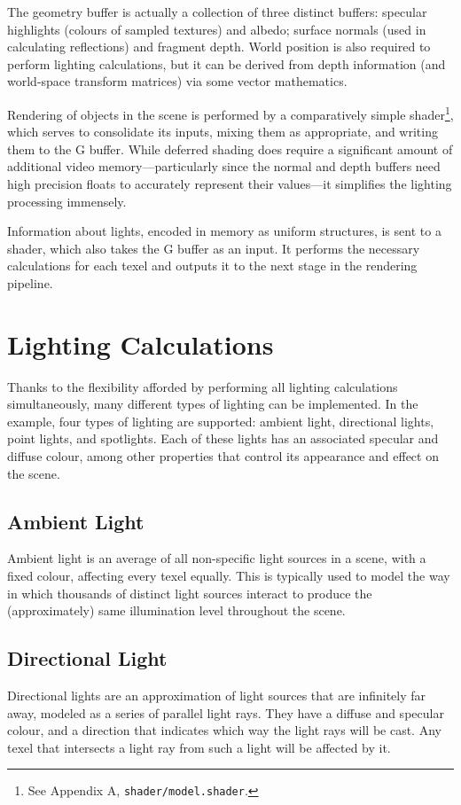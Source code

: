 \documentclass[11pt, oneside]{report}
\begin{document}
The geometry buffer is actually a collection of three distinct buffers: \gls{specular} highlights (colours of sampled textures) and albedo; surface normals (used in calculating reflections) and fragment depth. World position is also required to perform lighting calculations, but it can be derived from depth information (and world-space transform matrices) via some vector mathematics.

Rendering of objects in the scene is performed by a comparatively simple \gls{shader}\footnote{See Appendix A, \texttt{shader/model.shader}.}, which serves to consolidate its inputs, mixing them as appropriate, and writing them to the G buffer. While deferred shading does require a significant amount of additional video memory---particularly since the normal and depth buffers need high precision \glspl{float} to accurately represent their values---it simplifies the lighting processing immensely.

Information about lights, encoded in memory as uniform structures, is sent to a shader, which also takes the G buffer as an input. It performs the necessary calculations for each \gls{texel} and outputs it to the next stage in the rendering pipeline.

\section{Lighting Calculations}
Thanks to the flexibility afforded by performing all lighting calculations simultaneously, many different types of lighting can be implemented. In the example, four types of lighting are supported: ambient light, directional lights, point lights, and spotlights. Each of these lights has an associated \gls{specular} and \gls{diffuse} colour, among other properties that control its appearance and effect on the scene.

\subsection{Ambient Light}
Ambient light is an average of all non-specific light sources in a scene, with a fixed colour, affecting every \gls{texel} equally. This is typically used to model the way in which thousands of distinct light sources interact to produce the (approximately) same illumination level throughout the scene.

\subsection{Directional Light}
Directional lights are an approximation of light sources that are infinitely far away, modeled as a series of parallel light rays. They have a diffuse and specular colour, and a direction that indicates which way the light rays will be cast. Any \gls{texel} that intersects a light ray from such a light will be affected by it.
\end{document}
